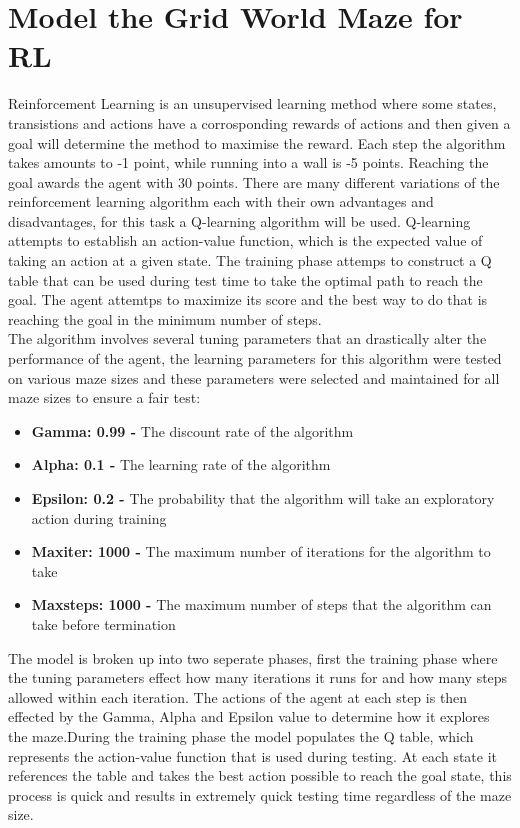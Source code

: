 \documentclass[twoside, 12pt, a4paper]{article}
\begin{document}
\section{Model the Grid World Maze for RL} \label{ModelRL}
Reinforcement Learning is an unsupervised learning method where some states, transistions and actions have a corrosponding rewards of actions and then given a goal will determine the method to maximise the reward. Each step the algorithm takes amounts to -1 point, while running into a wall is -5 points. Reaching the goal awards the agent with 30 points. There are many different variations of the reinforcement learning algorithm each with their own advantages and disadvantages, for this task a Q-learning  algorithm will be used. Q-learning attempts to establish an action-value function, which is the expected value of taking an action at a given state. The training phase attemps to construct a Q table that can be used during test time to take the optimal path to reach the goal.  The agent attemtps to maximize its score and the best way to do that is reaching the goal in the minimum number of steps.\\
The algorithm involves several tuning parameters that an drastically alter the performance of the agent, the learning parameters for this algorithm were tested on various maze sizes and these parameters were selected and maintained for all maze sizes to ensure a fair test:
\begin{itemize}
\item \textbf{Gamma: 0.99 -} The discount rate of the algorithm
\item \textbf{Alpha: 0.1 -} The learning rate of the algorithm
\item \textbf{Epsilon: 0.2 -} The probability that the algorithm will take an exploratory action during training
\item \textbf{Maxiter: 1000 -} The maximum number of iterations for the algorithm to take
\item \textbf{Maxsteps: 1000 -} The maximum number of steps that the algorithm can take before termination
\end{itemize}
The model is broken up into two seperate phases, first the training phase where the tuning parameters effect how many iterations it runs for and how many steps allowed within each iteration. The actions of the agent at each step is then effected by the Gamma, Alpha and Epsilon value to determine how it explores the maze.During the training phase the model populates the Q table, which represents the action-value function that is used during testing. At each state it references the table and takes the best action possible to reach the goal state, this process is quick and results in extremely quick testing time regardless of the maze size.
\end{document}

